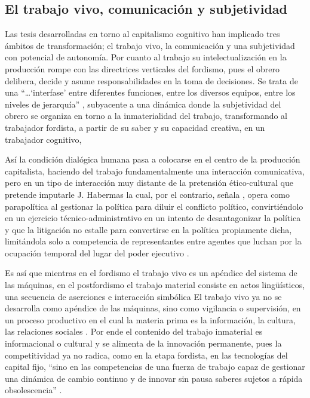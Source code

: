 \documentclass[
  spanish,
  11pt,
  a4paper,
]{scrbook}
\begin{document}
\subsection*{El trabajo vivo, comunicación y
subjetividad}\label{el-trabajo-vivo-comunicaciuxf3n-y-subjetividad}

Las tesis desarrolladas en torno al capitalismo cognitivo han implicado
tres ámbitos de transformación; el trabajo vivo, la comunicación y una
subjetividad con potencial de autonomía. Por cuanto al trabajo su
intelectualización en la producción rompe con las directrices verticales
del fordismo, pues el obrero delibera, decide y asume responsabilidades
en la toma de decisiones. Se trata de una ``\ldots{}`interfase' entre
diferentes funciones, entre los diversos equipos, entre los niveles de
jerarquía'' \autocite[11]{Negri2001}, subyacente a una dinámica donde la
subjetividad del obrero se organiza en torno a la inmaterialidad del
trabajo, transformando al trabajador fordista, a partir de su saber y su
capacidad creativa, en un trabajador cognitivo,

Así la condición dialógica humana pasa a colocarse en el centro de la
producción capitalista, haciendo del trabajo fundamentalmente una
interacción comunicativa, pero en un tipo de interacción muy distante de
la pretensión ético-cultural que pretende imputarle J. Habermas la cual,
por el contrario, señala \textcite{Zizek2007}, opera como parapolítica
al gestionar la política para diluir el conflicto político,
convirtiéndolo en un ejercicio técnico-administrativo en un intento de
desantagonizar la política y que la litigación no estalle para
convertirse en la política propiamente dicha, limitándola solo a
competencia de representantes entre agentes que luchan por la ocupación
temporal del lugar del poder ejecutivo \autocite[204]{Zizek2007}.

Es así que mientras en el fordismo el trabajo vivo es un apéndice del
sistema de las máquinas, en el postfordismo el trabajo material consiste
en actos lingüísticos, una secuencia de aserciones e interacción
simbólica El trabajo vivo ya no se desarrolla como apéndice de las
máquinas, sino como vigilancia o supervisión, en un proceso productivo
en el cual la materia prima es la información, la cultura, las
relaciones sociales \autocite{Virno2003}. Por ende el contenido del
trabajo inmaterial es informacional o cultural y se alimenta de la
innovación permanente, pues la competitividad ya no radica, como en la
etapa fordista, en las tecnologías del capital fijo, ``sino en las
competencias de una fuerza de trabajo capaz de gestionar una dinámica de
cambio continuo y de innovar sin pausa saberes sujetos a rápida
obsolescencia'' \autocite[46]{Vercellone2011}.
\end{document}
